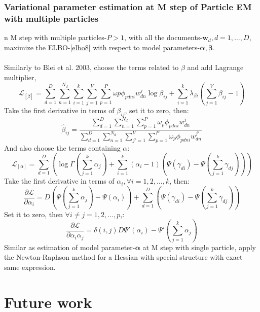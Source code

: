 \documentclass{article}
\newcommand{\bs}{\boldsymbol}
\newcommand{\Sum}{\displaystyle\sum}
\begin{document}
\subsubsection{Variational parameter estimation at M step of Particle EM with multiple particles}
n M step with multiple particles-$P>1$, with all the documents-$\bs{w}_d,d=1,\ldots,D$, maximize the  ELBO-\ref{elbo8} with respect to model parameters-$\bs{\alpha,}\bs{\beta}$.\\
\\
Similarly to Blei et al. 2003, choose the terms related to $\beta$ and add Lagrange multiplier,\\
\[
\mathcal{L}_{[\beta]}=\Sum_{d=1}^{D}\Sum_{n=1}^{N_d}\Sum_{i=1}^{k}\Sum_{j=1}^{V}\Sum_{p=1}^{P}\omega{p}\phi_{pdni}w_{dn}^j\log\beta_{ij}+\Sum_{i=1}^{k}\lambda_{\beta i}(\Sum_{j=1}^{V}\beta_{ij}-1)
\]
Take the first derivative in terms of $\beta_{ij}$, set it to zero, then:\\
\[
\hat{\beta}_{ij}=\frac{\sum_{d=1}^{D}\sum_{n=1}^{N_d}\sum_{p=1}^{P}\omega_{p}\phi_{pdni}w_{dn}^j}{\sum_{d=1}^{D}\sum_{n=1}^{N_d}\sum_{j'=1}^{V}\sum_{p=1}^{P}\omega_{p}\phi_{pdni}w_{dn}^{j'}}
\]
And also choose the terms containing $\alpha$:\\
\[
\mathcal{L}_{[\alpha]}=\Sum_{d=1}^{D}\left(\log\Gamma(\sum_{j=1}^{k}\alpha_j)+\Sum_{i=1}^{k}(\alpha_i-1)(\Psi(\gamma_{di})-\Psi(\sum_{j=1}^{k}\gamma_{dj}))\right)
\]
Take the first derivative in terms of $\alpha_{i},\forall i=1,2,\ldots,k$,  then:\\
\[
\frac{\partial \mathcal{L}}{\partial \alpha_{i} }=D(\Psi(\sum_{j=1}^{k}\alpha_j)-\Psi(\alpha_i))+\Sum_{d=1}^{D}(\Psi(\gamma_{di})-\Psi(\sum_{j=1}^{k}\gamma_{dj}))
\]
Set it to zero, then $\forall i\neq j=1,2,\ldots,p$,:\\
\[
\frac{\partial \mathcal{L}}{\partial \alpha_{i}\alpha_{j} }=\delta(i,j)D\Psi'(\alpha_i)-\Psi'(\sum_{j=1}^{k}\alpha_j)
\]
Similar as estimation of model parameter-$\bs{\alpha}$ at M step with single particle, apply the Newton-Raphson method for a Hessian with special structure with exact same expression.
\section{Future work}
\end{document}
